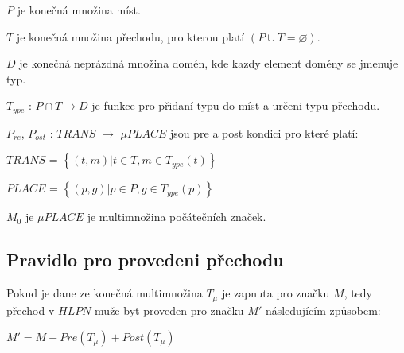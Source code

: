 \begin{itemize}
  \item $P$ je konečná množina míst. \\
  \item $T$ je konečná množina přechodu, pro kterou platí $\left(P \cup T = \varnothing\right)$. \\
  \item $D$ je konečná neprázdná množina domén, kde kazdy element domény se jmenuje typ. \\
  \item $T_{ype}$ : $P \cap T \rightarrow D$ je funkce pro přidaní typu do míst a určeni typu přechodu.
  \item $P_{re}$, $P_{ost}$ : $TRANS$ $\rightarrow$ $\mu PLACE$ jsou pre a post kondici pro které platí: \\
  \begin{center}
    \item $TRANS$ = $\left\{\left(t, m\right) | t \in T, m \in T_{ype} \left( t \right)\right\}$ \\
    \item $PLACE$ = $\left\{\left(p, g\right) | p \in P, g \in T_{ype} \left( p \right)\right\}$ \\
  \end{center}
  \item $M_0$ je $\mu PLACE$ je multimnožina počátečních značek.
\end{itemize}

\subsection{Pravidlo pro provedeni přechodu}
Pokud je dane ze konečná multimnožina $T_\mu$ je zapnuta pro značku $M$, tedy přechod v $HLPN$ muže byt proveden pro značku $M'$ následujícím způsobem:
\begin{center}
  $M' = M - Pre(T_\mu) + Post(T_\mu)$
\end{center}

